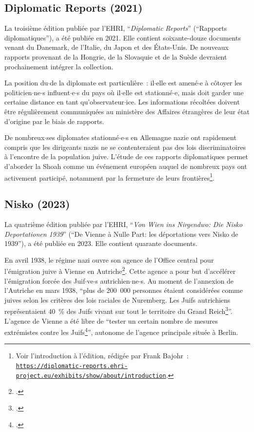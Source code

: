 \subsection{Diplomatic Reports (2021)}
La troisième édition publiée par l'EHRI, \enquote{\textit{Diplomatic Reports}} (\enquote{Rapports diplomatiques}), a été publiée en 2021. Elle contient soixante-douze documents venant du Danemark, de l'Italie, du Japon et des États-Unis. De nouveaux rapports provenant de la Hongrie, de la Slovaquie et de la Suède devraient prochainement intégrer la collection.  

La position du$\cdot$de la diplomate est particulière~: il$\cdot$elle est amené$\cdot$e à côtoyer les politicien$\cdot$ne$\cdot$s influent$\cdot$e$\cdot$s du pays où il$\cdot$elle est stationné$\cdot$e, mais doit garder une certaine distance en tant qu'observateur$\cdot$ice. Les informations récoltées doivent être régulièrement communiquées au ministère des Affaires étrangères de leur état d'origine par le biais de rapports.

De nombreux$\cdot$ses diplomates stationné$\cdot$e$\cdot$s en Allemagne nazie ont rapidement compris que les dirigeants nazis ne se contenteraient pas des lois discriminatoires à l'encontre de la population juive. L'étude de ces rapports diplomatiques permet d'aborder la Shoah comme un événement européen auquel de nombreux pays ont activement participé, notamment par la fermeture de leurs frontières\footnote{Voir l'introduction à l'édition, rédigée par Frank Bajohr~: \texttt{\href{https://diplomatic-reports.ehri-project.eu/exhibits/show/about/introduction}{https://diplomatic-reports.ehri-project.eu/exhibits/show/about/introduction}}.}.  


\subsection{Nisko (2023)}
La quatrième édition publiée par l'EHRI, \enquote{\textit{Von Wien ins Nirgendwo: Die Nisko Deportationen 1939}} (\enquote{De Vienne à Nulle Part: les déportations vers Nisko de 1939}), a été publiée en 2023. Elle contient quarante documents.  

En avril 1938, le régime nazi ouvre son agence de l'Office central pour l'émigration juive à Vienne en Autriche\footcite[p.~30]{Bensoussan2020}. Cette agence a pour but d'accélérer l'émigration forcée des Juif$\cdot$ve$\cdot$s autrichien$\cdot$ne$\cdot$s. Au moment de l'annexion de l'Autriche en mars 1938, \enquote{plus de 200~000 personnes étaient considérées comme juives selon les critères des lois raciales de Nuremberg. Les Juifs autrichiens représentaient 40~\%{} des Juifs vivant sur tout le territoire du Grand Reich\footcite[p.~137]{Safrian2007}}. L'agence de Vienne a été libre de \enquote{tester un certain nombre de mesures extrémistes contre les Juifs\footcite[p.~132]{Safrian2007}}, autonome de l'agence principale située à Berlin.  

